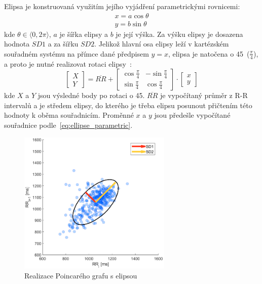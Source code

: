 Elipsa je konstruovaná využitím jejího vyjádření parametrickými rovnicemi:
\begin{gather}
    \label{eq:ellipse_parametric}
    x = a \cos \theta \nonumber \\
    y = b \sin \theta
\end{gather}
kde $\theta \in \langle 0, 2\pi \rangle$, $a$ je šířka elipsy a $b$ je její
výška. Za výšku elipsy je dosazena hodnota $SD1$ a za šířku $SD2$. Jelikož
hlavní osa elipsy leží v kartézském souřadném systému na přímce dané předpisem
$y=x$, elipsa je natočena o 45\degree~($\frac{\pi}{4}$), a proto je nutné
realizovat rotaci elipsy~\cite{Mazhar2007}:
\begin{equation}
    \begin{bmatrix}
        X \\
        Y
    \end{bmatrix}
    =
    \overline{RR} +
    \begin{bmatrix}
        \cos \frac{\pi}{4} & -\sin \frac{\pi}{4} \\
        \sin \frac{\pi}{4} & \cos \frac{\pi}{4}
    \end{bmatrix}
    \cdot
    \begin{bmatrix}
        x \\
        y
    \end{bmatrix}
\end{equation}
kde $X$ a $Y$ jsou výsledné body po rotaci o 45\degree. $\overline{RR}$ je
vypočítaný průměr z R-R intervalů a je středem elipsy, do kterého je třeba
elipsu posunout přičtením této hodnoty k oběma souřadnicím. Proměnné $x$ a $y$
jsou předešle vypočítané souřadnice podle~\ref{eq:ellipse_parametric}.

\bigskip

\begin{figure}[h]
    \begin{center}
        \includegraphics[width=0.65\textwidth]{../assets/figures/my_poincare}
        \caption{Realizace Poincarého grafu s elipsou}
        \label{fig:my_poincare}
    \end{center}
\end{figure}

